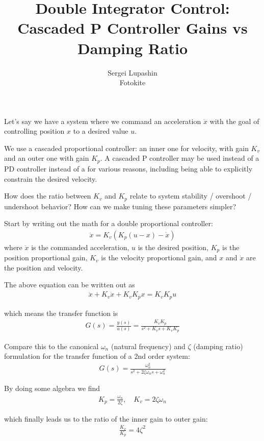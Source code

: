 \documentclass{article}
\title{Double Integrator Control: Cascaded P Controller Gains vs Damping Ratio}
\author{
    \parbox{0.3\linewidth}{\centering Sergei Lupashin\\Fotokite}
}
\begin{document}
    \maketitle

    Let's say we have a system where we command an acceleration $\ddot{x}$ with the goal of controlling position $x$ to a desired value $u$.

    We use a cascaded proportional controller: an inner one for velocity, with gain $K_v$ and an outer one with gain $K_p$. A cascaded P controller may be used instead of a PD controller instead of a for various reasons, including being able to explicitly constrain the desired velocity.

    How does the ratio between $K_v$ and $K_p$ relate to system stability / overshoot / undershoot behavior? How can we make tuning these parameters simpler?

    Start by writing out the math for a double proportional controller:
    \begin{align}
        \ddot{x} = K_v(K_p (u - x) - \dot{x})
    \end{align}
    where $\ddot{x}$ is the commanded acceleration, $u$ is the desired position, $K_p$ is the position proportional gain, $K_v$ is the velocity proportional gain, and $x$ and $\dot{x}$ are the position and velocity.

    The above equation can be written out as
    \begin{align}
        \ddot{x}+K_v \dot{x} + K_v K_p x = K_v K_p u
    \end{align}

    which means the transfer function is
    \begin{align}
        G(s) = \frac{y(s)}{u(s)} = \frac{K_v K_p}{s^2 + K_v s + K_v K_p}
    \end{align}

    Compare this to the canonical $\omega_n$ (natural frequency) and $\zeta$ (damping ratio) formulation for the transfer function of a 2nd order system:
    \begin{align}
        G(s) = \frac{\omega_n^2}{s^2+2\zeta \omega_n s + \omega_n ^2}
    \end{align}

    By doing some algebra we find
    \begin{align}
        K_p = \frac{\omega_n}{2 \zeta}, \quad K_v = 2 \zeta \omega_n
    \end{align}

    which finally leads us to the ratio of the inner gain to outer gain:
    \begin{align}
        \frac{K_v}{K_p} = 4 \zeta^2
    \end{align}
\end{document}
